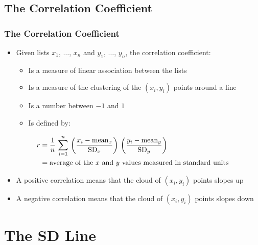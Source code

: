 \documentclass[t]{beamer}
\begin{document}
\subsection{The Correlation Coefficient}
\begin{frame}[t]\frametitle{The Correlation Coefficient}
{\small
\begin{itemize}
\item Given lists $x_1$, $\dots$, $x_n$ and $y_1$, $\dots$, $y_n$, the correlation
  coefficient:
  \begin{itemize} 
     \item Is a measure of linear association between the lists
     \item Is a measure of the clustering of the $(x_i, y_i)$ points around a line
     \item Is a number between $-1$ and $1$
     \item Is defined by:\vspace{-10pt}
   \end{itemize}
\end{itemize}
\begin{align*}
r &=\frac{1}{n}\,\sum_{i=1}^n\,\left(\frac{x_i - \mbox{mean}_x}{\mbox{SD}_x}\right)\,
  \left(\frac{y_i - \mbox{mean}_y}{\mbox{SD}_y}\right)\\
  &= \mbox{average of the $x$ and $y$ values measured in standard units}\vspace{-20pt}
\end{align*}\vspace{-15pt}
\begin{itemize}
\item A positive correlation means that the cloud of $(x_i, y_i)$ points slopes up
\item A negative correlation means that the cloud of $(x_i, y_i)$ points slopes down
\end{itemize}

}
\end{frame}

\section{The SD Line}
\end{document}
